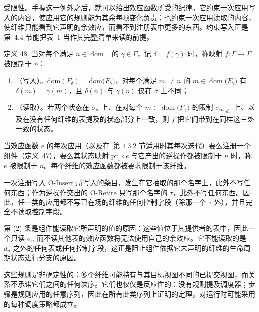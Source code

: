 受限性。手握这一例外之后，就可以给出效应函数所受的纪律。它约束一次应用写入的内容，使应用它的规则能为其余每项变化负责；也约束一次应用读取的内容，使纤维只能看到它声明的余效应，而看不到注册表中更多的东西。约束写入正是第~4.4 节能把表~1 当作其完整清单来读的前提。

定义 48. 当对每个满足 \(n \in \mathop { \mathrm { d o m } } \mathop { \left( F _ { \gamma } \right) }\) 的 \(\gamma \in \Gamma\)，记 \(\delta = f ( \gamma )\) 时，称映射 \(f : \Gamma \to \Gamma\) 被限制于 $n$：

\begin{enumerate}
\def\labelenumi{\arabic{enumi}.}
\item
  （写入）。\(\mathrm { d o m } ( F _ { \delta } ) = \mathrm { d o m } \big ( F _ { \gamma } \big )\)，对每个满足 $m$ \(\neq n\) 的 \(m \in \mathop { \mathrm { d o m } } \bigl ( F _ { \gamma } \bigr )\) 有 \(\delta ( m ) = \gamma ( m )\)，且 \(\delta ( n )\) 与 \(\gamma ( n )\) 仅在 $\sigma$ 上不同；
\item
  （读取）。若两个状态在 \(\sigma _ { n }\) 上、在对每个 \(m \in \mathop { \mathrm { d o m } } \bigl ( F _ { \gamma } \bigr )\) 的限制 \(\sigma _ { m } | _ { d _ { n } }\) 上、以及在没有任何纤维的表提及的状态部分上一致，则 $f$ 把它们带到在同样这三处一致的状态。
\end{enumerate}

当效应函数 $e$ 的每次应用（以及在~第 4.3.2 节适用时其每次迭代）要么注册一个组件（定义~47），要么其状态映射 \(\mathrm { p r } _ { 1 } \circ e\) 与它产出的逆操作都被限制于 $n$ 时，称 $e$ 被限制于 $n$。每个纤维的效应函数都被要求限制于该纤维。

一次注册写入 O-Insert 所写入的条目，发生在它抽取的那个名字上，此外不写任何东西；作为逆操作交出的 O-Retire 只写那个名字的 \(\tau\)，此外不写任何东西。因此，任一类的应用都不写已在场的纤维的任何控制字段（除那一个 \(\tau\) 外），并且完全不读取控制字段。

第 (2) 条是组件能读取它所声明的值的原因：这些值位于其提供者的表中，因此一个只读 \(\sigma _ { n }\) 而不读其他表的效应函数将无法使用自己的余效应。它不能读取的是 \(d _ { n }\) 之外的任何表或任何控制字段，这正是阻止组件依据它未声明的纤维的生命周期状态进行分支的原因。

这些规则是非确定性的：多个纤维可能持有与其目标视图不同的已提交视图，而关系不承诺它们之间的任何次序。它们也仅仅是反应性的：没有规则提及调度器；步骤是规则应用的任意序列，因此在所有此类序列上证明的定理，对运行时可能采用的每种调度策略都成立。
